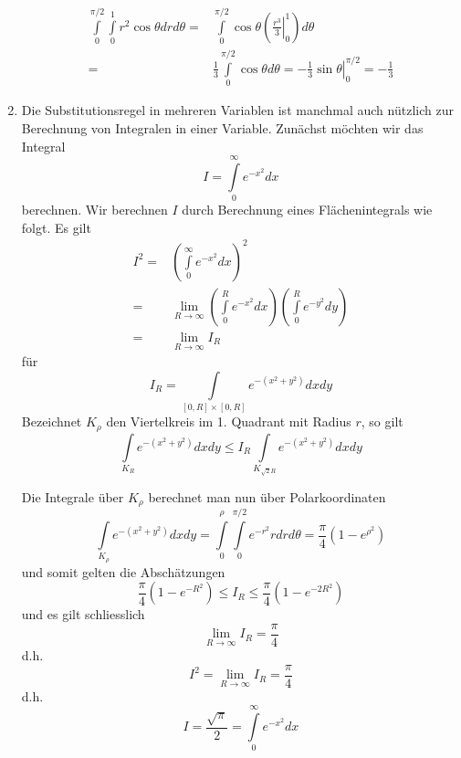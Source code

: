 \begin{enumerate}
\begin{align*}
\int\limits_0^{\pi /2} {\int\limits_0^1 {{r^2}\cos \theta drd\theta } }  =&\int\limits_0^{\pi /2} {\cos \theta \left( {\left. {\frac{{{r^3}}}{3}} \right|_0^1} \right)d\theta } \\
 =&\frac{1}{3}\int\limits_0^{\pi /2} {\cos \theta d\theta }  = \left. { - \frac{1}{3}\sin \theta } \right|_0^{\pi /2} =  - \frac{1}{3}
\end{align*}
\item Die Substitutionsregel in mehreren Variablen ist manchmal auch nützlich zur Berechnung von Integralen in einer Variable. Zunächst möchten wir das Integral \[ I=\int\limits_0^\infty e^{-x^2} dx\] berechnen. Wir berechnen $I$ durch Berechnung eines Flächenintegrals wie folgt. Es gilt
\begin{align*}
{I^2} =&{\left( {\int\limits_0^\infty  {{e^{ - {x^2}}}dx} } \right)^2}\\
 =&\mathop {\lim }\limits_{R \to \infty } \left( {\int\limits_0^R {{e^{ - {x^2}}}dx} } \right)\left( {\int\limits_0^R {{e^{ - {y^2}}}dy} } \right)\\
 =&\mathop {\lim }\limits_{R \to \infty } {I_R}
\end{align*}
für \[{I_R} = \int\limits_{\left[ {0,R} \right] \times \left[ {0,R} \right]} {{e^{ - \left( {{x^2} + {y^2}} \right)}}dxdy} \]
Bezeichnet $K_\rho$ den Viertelkreis im 1. Quadrant mit Radius $r$, so gilt
\[\int\limits_{{K_R}} {{e^{ - \left( {{x^2} + {y^2}} \right)}}dxdy \le {I_R}\int\limits_{{K_{\sqrt 2 R}}} {{e^{ - \left( {{x^2} + {y^2}} \right)}}dxdy} } \]

\begin{center}
\end{center}

Die Integrale über $K_\rho$ berechnet man nun über Polarkoordinaten
\[\int\limits_{{K_\rho }} {{e^{ - \left( {{x^2} + {y^2}} \right)}}dxdy}  = \int\limits_0^\rho  {\int\limits_0^{\pi /2} {{e^{ - {r^2}}}rdrd\theta } }  = \frac{\pi }{4}\left( {1 - {e^{{\rho ^2}}}} \right)\]
und somit gelten die Abschätzungen
\[\frac{\pi }{4}\left( {1 - {e^{ - {R^2}}}} \right) \le {I_R} \le \frac{\pi }{4}\left( {1 - {e^{ - 2{R^2}}}} \right)\]
und es gilt schliesslich
\[\mathop {\lim }\limits_{R \to \infty } {I_R} = \frac{\pi }{4}\]
d.h. \[{I^2} = \mathop {\lim }\limits_{R \to \infty } {I_R} = \frac{\pi }{4}\]
d.h. \[I = \frac{{\sqrt \pi  }}{2} = \int\limits_0^\infty  {{e^{ - {x^2}}}dx} \]
\end{enumerate}

